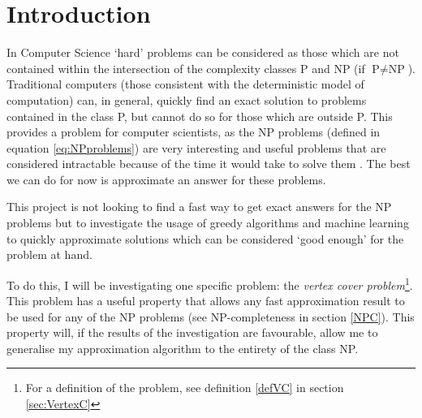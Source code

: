 \documentclass[11pt]{article}
\theoremstyle{definition}
\begin{document}
  \tableofcontents

  \newpage

  \section{Introduction}
    In Computer Science `hard' problems can be considered as those which are not contained within the
    intersection of the complexity classes P and NP (if $\text{P} \neq \text{NP}$).   Traditional computers (those consistent with the
    deterministic model of computation) can, in general, quickly find an exact solution to problems contained
    in the class P, but cannot do so for those which are outside P. This provides
    a problem for computer scientists, as the NP problems (defined in equation \ref{eq:NPproblems})
    are very interesting and useful problems that are considered intractable because of the
    time it would take to solve them \cite{Sipser:2005}. The best we can do for now is approximate an answer for these
    problems.

    This project is not looking to find a fast way to get exact answers for the NP problems
    but to investigate the usage of greedy
    algorithms and machine learning to quickly approximate solutions which can be considered `good enough'
    for the problem at hand.

    To do this, I will be investigating one specific problem: the \emph{vertex cover problem}\footnote{For a definition
    of the problem, see definition \ref{defVC} in section \ref{sec:VertexC}}. This problem has a useful property that 
    allows any fast approximation result to be used for any of the NP problems (see NP-completeness in section \ref{NPC}). 
    This property will, if the results of the investigation are favourable, allow me to generalise my approximation algorithm
    to the entirety of the class NP. 
\end{document}
